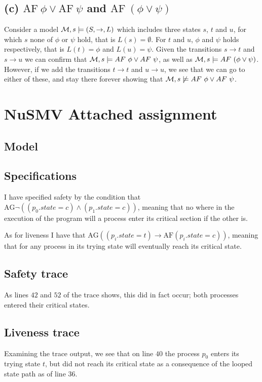 \documentclass[11pt,a4paper]{article}
\let\imp\to
\begin{document}
\subsection*{(c) \mdseries $\text{AF}{\ }\phi \lor \text{AF}{\ }\psi$ and
$\text{AF}{\ }(\phi \lor \psi)$}
Consider a model ${\cal M}, s \models (S,\imp,L)$ which includes three states
$s$, $t$ and $u$, for which $s$ none of $\phi$ or $\psi$ hold, that is $L(s)
= \emptyset$. For $t$ and $u$, $\phi$ and $\psi$ holds respectively, that is
$L(t) = \phi$ and $L(u) = \psi$. Given the transitions $s \imp t$ and $s \imp
u$ we can confirm that ${\cal M}, s \models AF{\ }\phi \lor AF{\ }\psi$, as
well as ${\cal M}, s \models AF{\ }(\phi \lor \psi)$. However, if we add the
transitions $t \imp t$ and $u \imp u$, we see that we can go to either of
these, and stay there forever showing that
${\cal M}, s \not\models AF{\ }\phi \lor AF{\ }\psi$.

\newpage
\section*{NuSMV \mdseries Attached assignment}
\subsection*{Model}


\subsection*{Specifications}
I have specified safety by the condition that $\text{AG} \neg( (p_0.state = c)
\land (p_1.state = c) )$, meaning that no where in the execution of the program
will a process enter its critical section if the other is.

As for liveness I have that $\text{AG} ( (p_i.state = t) \imp \text{AF}
(p_i.state = c) )$, meaning that for any process in its trying state will
eventually reach its critical state.

\newpage
\subsection*{Safety trace}

As lines $42$ and $52$ of the trace shows, this did in fact occur; both
processes entered their critical states.

\newpage
\subsection*{Liveness trace}

Examining the trace output, we see that on line $40$ the process $p_0$ enters
its trying state $t$, but did not reach its critical state as a consequence of
the looped state path as of line $36$.
\end{document}
